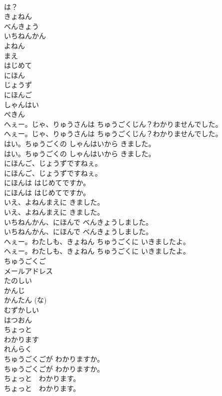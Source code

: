 \documentclass[8pt]{extreport}
\begin{document}
\begin{CJK}{UTF8}{min}
\\	は？ 
\\	きょねん
\\	べんきょう
\\	いちねんかん
\\	よねん
\\	まえ
\\	はじめて
\\	にほん
\\	じょうず
\\	にほんご
\\	しゃんはい
\\	ぺきん
\\	へぇー。じゃ、りゅうさんは ちゅうごくじん？わかりませんでした。	
\\	へぇー。じゃ、りゅうさんは ちゅうごくじん？わかりませんでした。 
\\	はい。ちゅうごくの しゃんはいから きました。	
\\	はい。ちゅうごくの しゃんはいから きました。 
\\	にほんご、じょうずですねぇ。	
\\	にほんご、じょうずですねぇ。 
\\	にほんは はじめてですか。	
\\	にほんは はじめてですか。 
\\	いえ、よねんまえに きました。	
\\	いえ、よねんまえに きました。 
\\	いちねんかん、にほんで べんきょうしました。	
\\	いちねんかん、にほんで べんきょうしました。 
\\	へぇー。わたしも、きょねん ちゅうごくに いきましたよ。	
\\	へぇー。わたしも、きょねん ちゅうごくに いきましたよ。 
\\	ちゅうごくご
\\	メールアドレス
\\	たのしい
\\	かんじ
\\	かんたん (な)
\\	むずかしい
\\	はつおん
\\	ちょっと
\\	わかります
\\	れんらく
\\	ちゅうごくごが わかりますか。	
\\	ちゅうごくごが わかりますか。 
\\	ちょっと　わかります。	
\\	ちょっと　わかります。 

\end{CJK}
\end{document}
